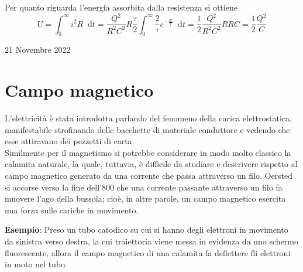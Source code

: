\documentclass[a4paper]{extarticle}
\newcommand\dif{\mathop{}\!\mathrm{d}}
\begin{document}
\vspace{1em}
\noindent
Per quanto riguarda l'energia assorbita dalla resistenza si ottiene
\[U = \int_0^\infty i^2 R \dif t = \frac{Q^2}{R^2C^2} R \frac{\tau}{2} \int_0^\infty \frac{2}{\tau} e^{-\frac{2t}{\tau}} \dif t = \frac{1}{2} \frac{Q^2}{R^2 C^2} R R C = \frac{1}{2} \frac{Q^2}{C}\]

\newpage
\noindent
\begin{center}
  21 Novembre 2022
\end{center}
\section{Campo magnetico}
L'elettricità è stata introdotta parlando del fenomeno della carica elettrostatica, manifestabile strofinando delle bacchette di materiale conduttore e vedendo che esse attiravano dei pezzetti di carta.\\
Similmente per il magnetismo si potrebbe considerare in modo molto classico la calamita naturale, la quale, tuttavia, è difficile da studiare e descrivere rispetto al campo magnetico generato da una corrente che passa attraverso un filo. Oersted si accorse verso la fine dell'$800$ che una corrente passante attraverso un filo fa muovere l'ago della bussola; cioè, in altre parole, un campo magnetico esercita una forza sulle cariche in movimento.

\vspace{1em}
\noindent
\textbf{Esempio}: Preso un tubo catodico su cui si hanno degli elettroni in movimento da sinistra verso destra, la cui traiettoria viene messa in evidenza da uno schermo fluorescente, allora il campo magnetico di una calamita fa deflettere fli elettroni in moto nel tubo.
\end{document}
